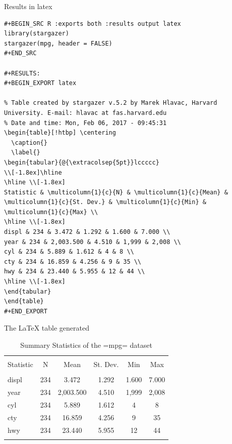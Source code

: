 \documentclass[presentation]{beamer}
\begin{document}
\begin{frame}[fragile,label={sec:org224e38b}]{Results in latex}
 \begin{verbatim}
#+BEGIN_SRC R :exports both :results output latex
library(stargazer)
stargazer(mpg, header = FALSE)
#+END_SRC

#+RESULTS:
#+BEGIN_EXPORT latex

% Table created by stargazer v.5.2 by Marek Hlavac, Harvard University. E-mail: hlavac at fas.harvard.edu
% Date and time: Mon, Feb 06, 2017 - 09:45:31
\begin{table}[!htbp] \centering
  \caption{}
  \label{}
\begin{tabular}{@{\extracolsep{5pt}}lccccc}
\\[-1.8ex]\hline
\hline \\[-1.8ex]
Statistic & \multicolumn{1}{c}{N} & \multicolumn{1}{c}{Mean} & \multicolumn{1}{c}{St. Dev.} & \multicolumn{1}{c}{Min} & \multicolumn{1}{c}{Max} \\
\hline \\[-1.8ex]
displ & 234 & 3.472 & 1.292 & 1.600 & 7.000 \\
year & 234 & 2,003.500 & 4.510 & 1,999 & 2,008 \\
cyl & 234 & 5.889 & 1.612 & 4 & 8 \\
cty & 234 & 16.859 & 4.256 & 9 & 35 \\
hwy & 234 & 23.440 & 5.955 & 12 & 44 \\
\hline \\[-1.8ex]
\end{tabular}
\end{table}
#+END_EXPORT
\end{verbatim}
\end{frame}

\begin{frame}[label={sec:org147990d}]{The \LaTeX{} table generated}

\begin{table}[!htbp] \centering
  \caption{Summary Statistics of the =mpg= dataset}
  \label{}
\begin{tabular}{@{\extracolsep{5pt}}lccccc}
\\[-1.8ex]\hline
\hline \\[-1.8ex]
Statistic & \multicolumn{1}{c}{N} & \multicolumn{1}{c}{Mean} & \multicolumn{1}{c}{St. Dev.} & \multicolumn{1}{c}{Min} & \multicolumn{1}{c}{Max} \\
\hline \\[-1.8ex]
displ & 234 & 3.472 & 1.292 & 1.600 & 7.000 \\
year & 234 & 2,003.500 & 4.510 & 1,999 & 2,008 \\
cyl & 234 & 5.889 & 1.612 & 4 & 8 \\
cty & 234 & 16.859 & 4.256 & 9 & 35 \\
hwy & 234 & 23.440 & 5.955 & 12 & 44 \\
\hline \\[-1.8ex]
\end{tabular}
\end{table}
\end{frame}
\end{document}
